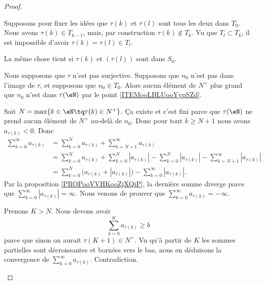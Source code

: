 \begin{proof}
\begin{subproof}
		Supposons pour fixer les idées que \( \tau(k) \) et \( \tau(l)\) sont tous les deux dans \( T_0\). Nous avons \( \tau(k)\in T_{k-1}\), mais, par construction \( \tau(k)\not\in T_k \). Vu que \( T_l\subset T_k\), il est impossible d'avoir \( \tau(k)=\tau(l)\in T_l\).

		La même chose tient si \( \tau(k)\) et \( (\tau(l)) \) sont dans \( S_0\).


		Nous supposons que \( \tau\) n'est pas surjective. Supposons que \( n_0\) n'est pas dans l'image de \( \tau\), et supposons que \( n_0\in T_0\). Alors aucun élément de \( N^+\) plus grand que \( n_0\) n'est dans \( \tau(\eN)\) par le point \ref{ITEMooLBLUooYypSZd}.

		Soit \( N=\max\{ k\in \eN\tq \tau(k)\in N^+ \}\). Ça existe et c'est fini parce que \( \tau(\eN)\) ne prend aucun élément de \( N^+\) au-delà de \( n_0\). Donc pour tout \( k\geq N+1\) nous avons \( a_{\tau(k)}<0\). Donc
		\begin{subequations}
			\begin{align}
				\sum_{k=0}^{\infty}a_{\tau(k)} & =\sum_{k=0}^Na_{\tau(k)}+\sum_{k=N+1}^{\infty}a_{\tau(k)}                                                             \\
				                               & =\sum_{k=0}^Na_{\tau(k)}+\sum_{k=0}^N| a_{\tau(k)} |-\sum_{k=0}^N| a_{\tau(k)} |-\sum_{k=N+1}^{\infty}| a_{\tau(k)} | \\
				                               & =\sum_{k=0}^N\Big( a_{\tau(k)}+| a_{\tau(k)} | \Big)-\sum_{k=0}^{\infty}| a_{\tau(k)} |.
			\end{align}
		\end{subequations}
		Par la proposition \ref{PROPooVVHKooZjXQiP}, la dernière somme diverge parce que \( \sum_{k=0}^{\infty}| a_{\tau(k)} |=\infty\). Nous venons de prouver que \( \sum_{k=0}^{\infty}a_{\tau(k)}=-\infty\).

		Prenons \( K>N\). Nous devons avoir
		\begin{equation}
			\sum_{k=0}^Ka_{\tau(k)}\geq b
		\end{equation}
		parce que sinon on aurait \( \tau(K+1)\in N^+\). Vu qu'à partir de \( K\) les sommes partielles sont décroissantes et bornées vers le bas, nous en déduisons la convergence de \( \sum_{k=0}^{\infty}a_{\tau(k)}\). Contradiction.



\end{subproof}
\end{proof}
